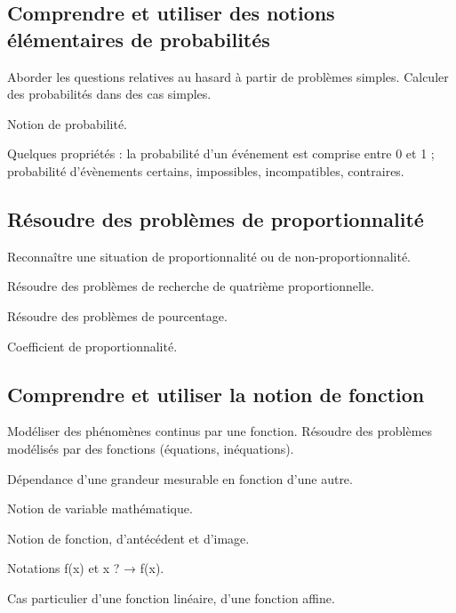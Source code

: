 \documentclass[11pt]{article}
\begin{document}
\subsection{Comprendre et utiliser des notions élémentaires de probabilités}

\begin{todolist}
    \item Aborder les questions relatives au hasard à partir de problèmes simples. Calculer des probabilités dans des cas simples.
    \item Notion de probabilité.
    \item Quelques propriétés : la probabilité d’un événement est comprise entre 0 et 1 ; probabilité d’évènements certains, impossibles, incompatibles, contraires.
\end{todolist}

\subsection{Résoudre des problèmes de proportionnalité}

\begin{todolist}
    \item Reconnaître une situation de proportionnalité ou de non-proportionnalité.
    \item Résoudre des problèmes de recherche de quatrième proportionnelle.
    \item Résoudre des problèmes de pourcentage.
    \item Coefficient de proportionnalité.
\end{todolist}

\subsection{Comprendre et utiliser la notion de fonction}

\begin{todolist}
    \item Modéliser des phénomènes continus par une fonction. Résoudre des problèmes modélisés par des fonctions (équations, inéquations).
    \item Dépendance d’une grandeur mesurable en fonction d’une autre.
    \item Notion de variable mathématique.
    \item Notion de fonction, d’antécédent et d’image.
    \item Notations f(x) et x ? → f(x).
    \item Cas particulier d’une fonction linéaire, d’une fonction affine.
\end{todolist}
\end{document}
